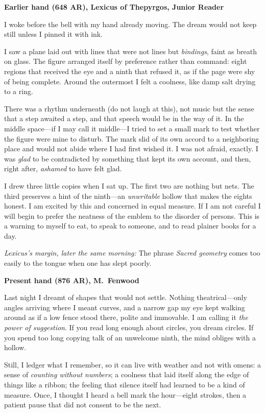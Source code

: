 \documentclass[11pt]{article}
\numberwithin{equation}{section} %
\theoremstyle{plain} %
\theoremstyle{definition} %
\theoremstyle{remark} %
\begin{document}
\medskip
\noindent\textbf{Earlier hand (648 AR), Lexicus of Thepyrgos, Junior Reader}

I woke before the bell with my hand already moving. The dream would not keep still unless I pinned it with ink.

I saw a plane laid out with lines that were not lines but \emph{bindings}, faint as breath on glass. The figure arranged itself by preference rather than command: eight regions that received the eye and a ninth that refused it, as if the page were shy of being complete. Around the outermost I felt a coolness, like damp salt drying to a ring.

There was a rhythm underneath (do not laugh at this), not music but the sense that a step awaited a step, and that speech would be in the way of it. In the middle space—if I may call it middle—I tried to set a small mark to test whether the figure were mine to disturb. The mark slid of its own accord to a neighboring place and would not abide where I had first wished it. I was not afraid, exactly. I was \emph{glad} to be contradicted by something that kept its own account, and then, right after, \emph{ashamed} to have felt glad.

I drew three little copies when I sat up. The first two are nothing but nets. The third preserves a hint of the ninth—an \emph{unwritable} hollow that makes the eights honest. I am excited by this and concerned in equal measure. If I am not careful I will begin to prefer the neatness of the emblem to the disorder of persons. This is a warning to myself to eat, to speak to someone, and to read plainer books for a day.

\medskip
\noindent\textit{Lexicus’s margin, later the same morning:} The phrase \emph{Sacred geometry} comes too easily to the tongue when one has slept poorly.

\medskip
\noindent\textbf{Present hand (876 AR), M.\ Fenwood}

Last night I dreamt of shapes that would not settle. Nothing theatrical—only angles arriving where I meant curves, and a narrow gap my eye kept walking around as if a low fence stood there, polite and immovable. I am calling it \emph{the power of suggestion}. If you read long enough about circles, you dream circles. If you spend too long copying talk of an unwelcome ninth, the mind obliges with a hollow.

Still, I ledger what I remember, so it can live with weather and not with omens: a sense of \emph{counting without numbers}; a coolness that laid itself along the edge of things like a ribbon; the feeling that silence itself had learned to be a kind of measure. Once, I thought I heard a bell mark the hour—eight strokes, then a patient pause that did not consent to be the next.
\end{document}
